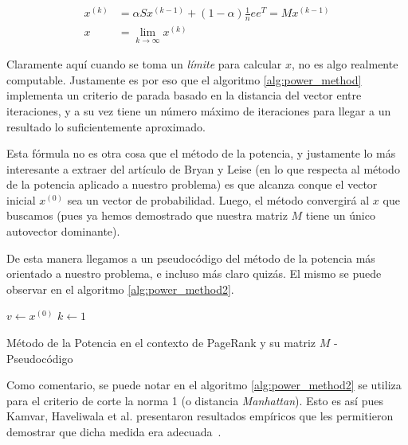 \begin{align*}
    x^{(k)} &= \alpha Sx^{(k-1)} + (1-\alpha)\frac{1}{n}ee^T = Mx^{(k-1)}\\
    x &= \lim_{k\rightarrow\infty} x^{(k)}
\end{align*}

\par Claramente aqu\'i cuando se toma un \emph{l\'imite} para calcular $x$, no
es algo realmente computable. Justamente es por eso que el algoritmo
\ref{alg:power_method} implementa un criterio de parada basado en la distancia
del vector entre iteraciones, y a su vez tiene un n\'umero m\'aximo de
iteraciones para llegar a un resultado lo suficientemente aproximado.

\par Esta f\'ormula no es otra cosa que el m\'etodo de la potencia, y justamente
lo m\'as interesante a extraer del art\'iculo de Bryan y Leise (en lo que
respecta al m\'etodo de la potencia aplicado a nuestro problema) es que alcanza
conque el vector inicial $x^{(0)}$ sea un vector de probabilidad. Luego, el
m\'etodo convergir\'a al $x$ que buscamos (pues ya hemos demostrado que nuestra
matriz $M$ tiene un \'unico autovector dominante).

\par De esta manera llegamos a un pseudoc\'odigo del m\'etodo de la potencia
m\'as orientado a nuestro problema, e incluso m\'as claro quiz\'as. El mismo se
puede observar en el algoritmo \ref{alg:power_method2}.

\begin{algorithm}
    $v\gets x^{(0)}$\;
    $k\gets 1$\;

    \caption{M\'etodo de la Potencia en el contexto de PageRank y su matriz $M$
    - Pseudoc\'odigo~\cite[p.263]{Kamvar2003}}
    \label{alg:power_method2}
\end{algorithm}

\par Como comentario, se puede notar en el algoritmo \ref{alg:power_method2} se
utiliza para el criterio de corte la norma 1 (o distancia \emph{Manhattan}).
Esto es as\'i pues Kamvar, Haveliwala et al. presentaron resultados emp\'iricos
que les permitieron demostrar que dicha medida era
adecuada~\cite[p.268]{Kamvar2003}.

